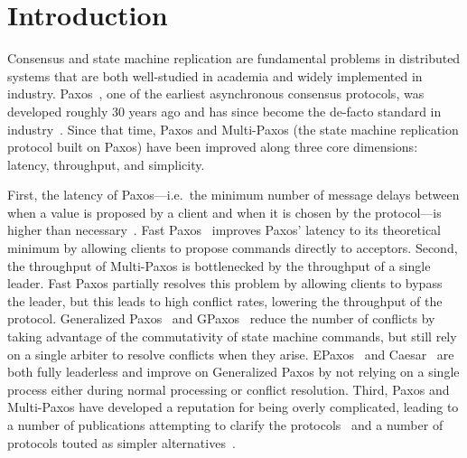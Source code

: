\section{Introduction}
Consensus and state machine replication are fundamental problems in distributed
systems that are both well-studied in academia and widely implemented in
industry.  Paxos~\cite{lamport1998part}, one of the earliest asynchronous
consensus protocols, was developed roughly 30 years ago and has since become
the de-facto standard in industry~\cite{burrows2006chubby, chandra2007paxos,
baker2011megastore, corbett2013spanner}. Since that time, Paxos and Multi-Paxos
(the state machine replication protocol built on Paxos) have been improved
along three core dimensions: latency, throughput, and simplicity.

First, the latency of Paxos---i.e.\ the minimum number of message delays
between when a value is proposed by a client and when it is chosen by the
protocol---is higher than necessary~\cite{lamport2006lower}. Fast
Paxos~\cite{lamport2006fast} improves Paxos' latency to its theoretical minimum
by allowing clients to propose commands directly to acceptors.
%
Second, the throughput of Multi-Paxos is bottlenecked by the throughput of a
single leader. Fast Paxos partially resolves this problem by allowing clients
to bypass the leader, but this leads to high conflict rates, lowering the
throughput of the protocol.  Generalized Paxos~\cite{lamport2005generalized}
and GPaxos~\cite{sutra2011fast} reduce the number of conflicts by taking
advantage of the commutativity of state machine commands, but still rely on a
single arbiter to resolve conflicts when they arise.
EPaxos~\cite{moraru2013there, moraru2013proof} and
Caesar~\cite{arun2017speeding} are both fully leaderless and improve on
Generalized Paxos by not relying on a single process either during normal
processing or conflict resolution.
%
Third, Paxos and Multi-Paxos have developed a reputation for being overly
complicated, leading to a number of publications attempting to clarify the
protocols~\cite{lamport2001paxos, lampson2001abcd, mazieres2007paxos,
van2015paxos} and a number of protocols touted as simpler
alternatives~\cite{ongaro2014search, rystsov2018caspaxos}.

